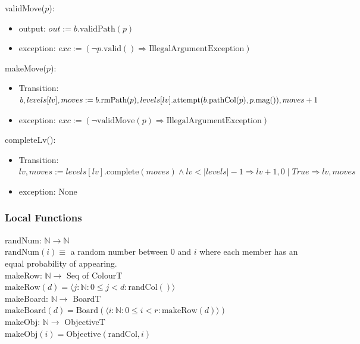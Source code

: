\documentclass[12pt]{article}
\newcommand{\Implies}{\Rightarrow}
\begin{document}
\noindent validMove($p$):
\begin{itemize}
	\item output: $out := b.\mbox{validPath}(p)$
	\item exception: $exc := (\lnot p.\mbox{valid}() \Implies \mbox{IllegalArgumentException})$
\end{itemize}

\noindent makeMove($p$):
\begin{itemize}
	\item Transition: $b, levels[lv], moves := b.\mbox{rmPath}(p), levels[lv].\mbox{attempt}(b.\mbox{pathCol}(p), p.\mbox{mag}()),\\
	moves + 1$
	\item exception: $exc := (\lnot \mbox{validMove}(p) \Implies \mbox{IllegalArgumentException})$
\end{itemize}

\noindent completeLv():
\begin{itemize}
	\item Transition: $lv, moves := levels[lv].\mbox{complete}(moves) \land lv < |levels| - 1 \Implies lv + 1, 0 \mid True \Implies lv, moves$
	\item exception: None
\end{itemize}

\subsubsection* {Local Functions}

\noindent randNum: $\mathbb{N} \rightarrow \mathbb{N}$\\
$\mbox{randNum}(i) \equiv$ a random number between $0$ and $i$ where each member has an equal probability of appearing.\\

\noindent makeRow: $\mathbb{N} \rightarrow$ Seq of ColourT\\
\noindent $\mbox{makeRow}(d) = \langle j : \mathbb{N} : 0 \le j < d: \mbox{randCol}() \rangle$\\

\noindent makeBoard: $\mathbb{N} \rightarrow$ BoardT\\
\noindent $\mbox{makeBoard}(d) = \mbox{Board}(\langle i : \mathbb{N} : 0 \le i < r: \mbox{makeRow}(d) \rangle)$\\

\noindent makeObj: $\mathbb{N} \rightarrow$ ObjectiveT\\
\noindent $\mbox{makeObj}(i) = \mbox{Objective}(\mbox{randCol}, i)$\\
\end{document}
